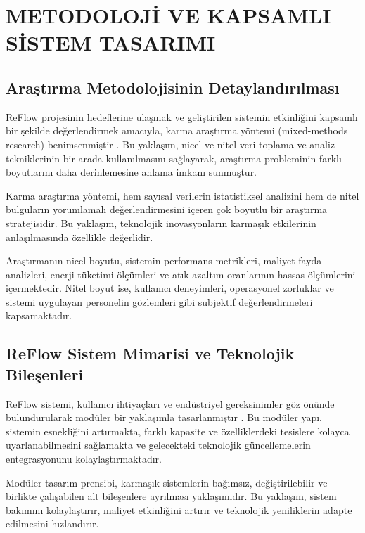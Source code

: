 \documentclass[12pt,a4paper]{article}
\begin{document}
\section{METODOLOJİ VE KAPSAMLI SİSTEM TASARIMI}

\subsection{Araştırma Metodolojisinin Detaylandırılması}

ReFlow projesinin hedeflerine ulaşmak ve geliştirilen sistemin etkinliğini kapsamlı bir şekilde değerlendirmek amacıyla, karma araştırma yöntemi (mixed-methods research) benimsenmiştir \cite{creswell2017designing}. Bu yaklaşım, nicel ve nitel veri toplama ve analiz tekniklerinin bir arada kullanılmasını sağlayarak, araştırma probleminin farklı boyutlarını daha derinlemesine anlama imkanı sunmuştur.

Karma araştırma yöntemi, hem sayısal verilerin istatistiksel analizini hem de nitel bulguların yorumlamalı değerlendirmesini içeren çok boyutlu bir araştırma stratejisidir. Bu yaklaşım, teknolojik inovasyonların karmaşık etkilerinin anlaşılmasında özellikle değerlidir.

Araştırmanın nicel boyutu, sistemin performans metrikleri, maliyet-fayda analizleri, enerji tüketimi ölçümleri ve atık azaltım oranlarının hassas ölçümlerini içermektedir. Nitel boyut ise, kullanıcı deneyimleri, operasyonel zorluklar ve sistemi uygulayan personelin gözlemleri gibi subjektif değerlendirmeleri kapsamaktadır.

\subsection{ReFlow Sistem Mimarisi ve Teknolojik Bileşenleri}

ReFlow sistemi, kullanıcı ihtiyaçları ve endüstriyel gereksinimler göz önünde bulundurularak modüler bir yaklaşımla tasarlanmıştır \cite{baldwin2020design}. Bu modüler yapı, sistemin esnekliğini artırmakta, farklı kapasite ve özelliklerdeki tesislere kolayca uyarlanabilmesini sağlamakta ve gelecekteki teknolojik güncellemelerin entegrasyonunu kolaylaştırmaktadır.

Modüler tasarım prensibi, karmaşık sistemlerin bağımsız, değiştirilebilir ve birlikte çalışabilen alt bileşenlere ayrılması yaklaşımıdır. Bu yaklaşım, sistem bakımını kolaylaştırır, maliyet etkinliğini artırır ve teknolojik yeniliklerin adapte edilmesini hızlandırır.
\end{document}
